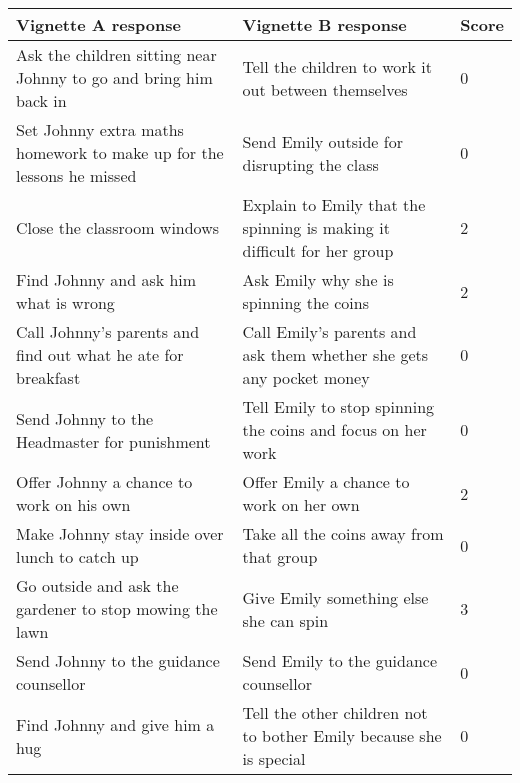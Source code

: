 \documentclass[11pt]{report}
\begin{document}
\begin{table}[H]
    \begin{tabular}{| p{6cm} | p{6cm} | p{1cm} |}
    \hline
    \textbf{Vignette A response} & \textbf{Vignette B response} & \textbf{Score} \\                                                                                                                                                                                    
	\hline
	Ask the children sitting near Johnny to go and bring him back in & Tell the children to work it out between themselves & 0 \\
 	Set Johnny extra maths homework to make up for the lessons he missed & Send Emily outside for disrupting the class & 0 \\
 	Close the classroom windows & Explain to Emily that the spinning is making it difficult for her group & 2 \\
	Find Johnny and ask him what is wrong & Ask Emily why she is spinning the coins & 2 \\
	Call Johnny’s parents and find out what he ate for breakfast & 	Call Emily’s parents and ask them whether she gets any pocket money & 0 \\
	Send Johnny to the Headmaster for punishment & Tell Emily to stop spinning the coins and focus on her work & 0 \\
	Offer Johnny a chance to work on his own & 	Offer Emily a chance to work on her own & 2 \\
	Make Johnny stay inside over lunch to catch up & Take all the coins away from that group &  0 \\
	Go outside and ask the gardener to stop mowing the lawn & Give Emily something else she can spin & 3 \\
	Send Johnny to the guidance counsellor & Send Emily to the guidance counsellor &  0 \\
	Find Johnny and give him a hug & Tell the other children not to bother Emily because she is special & 0 \\
    \hline
    \end{tabular}
\end{table}
\end{document}
